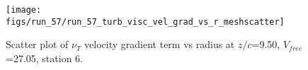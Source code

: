 \begin{figure}[H]
\centering
\texttt{[image: figs/run\_57/run\_57\_turb\_visc\_vel\_grad\_vs\_r\_meshscatter]}
\caption{Scatter plot of $\nu_T$ velocity gradient term vs radius at $z/c$=9.50, $V_{free}$=27.05, station 6.}
\label{fig:run_57_turb_visc_vel_grad_vs_r_meshscatter}
\end{figure}


